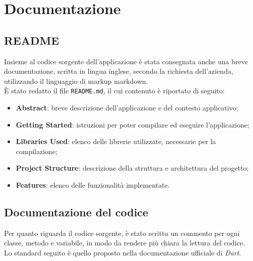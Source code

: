 \chapter{Documentazione}
\label{cap:documentazione}


\section{README}
\label{sec:readme}

Insieme al codice sorgente dell'applicazione è stata consegnata anche una breve documentazione, scritta in lingua inglese, secondo la richiesta dell'azienda, utilizzando il linguaggio di markup \gls{markdown}\glsoccur.\\
È stato redatto il file \lstinline{README.md}, il cui contenuto è riportato di seguito:
\begin{itemize}
    \item \textbf{Abstract}: breve descrizione dell'applicazione e del contesto applicativo;
    \item \textbf{Getting Started}: istruzioni per poter compilare ed eseguire l'applicazione;
    \item \textbf{Libraries Used}: elenco delle librerie utilizzate, necessarie per la compilazione;
    \item \textbf{Project Structure}: descrizione della struttura e architettura del progetto;
    \item \textbf{Features}: elenco delle funzionalità implementate.
\end{itemize}


\section{Documentazione del codice}
\label{sec:documentazione-codice}

Per quanto riguarda il codice sorgente, è stato scritto un commento per ogni classe, metodo e variabile, in modo da rendere più chiara la lettura del codice.\\
Lo standard seguito è quello proposto nella documentazione ufficiale di \emph{Dart}\cite{site:comment}. \\

